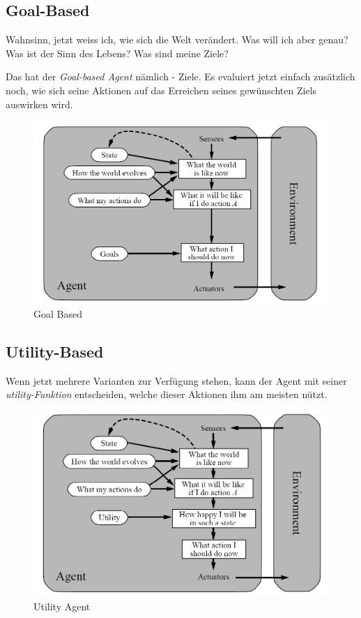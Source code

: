 \subsection{Goal-Based}
Wahnsinn, jetzt weiss ich, wie sich die Welt verändert. Was will ich aber genau? Was ist der Sinn des Lebens? Was sind meine Ziele? 

Das hat der \textit{Goal-based Agent} nämlich - Ziele. Es evaluiert jetzt einfach zusätzlich noch, wie sich seine Aktionen auf das Erreichen seines gewünschten Ziels auswirken wird.
\begin{figure}[h!]
\centering
\includegraphics[width=0.5\linewidth]{fig/goal_agent}
\caption{Goal Based}
\label{fig:goal_agent}
\end{figure}

\subsection{Utility-Based}
Wenn jetzt mehrere Varianten zur Verfügung stehen, kann der Agent mit seiner \textit{utility-Funktion} entscheiden, welche dieser Aktionen ihm am meisten nützt.
\begin{figure}[h!]
\centering
\includegraphics[width=0.5\linewidth]{fig/utility_agent}
\caption{Utility Agent}
\label{fig:utility_agent}
\end{figure}

